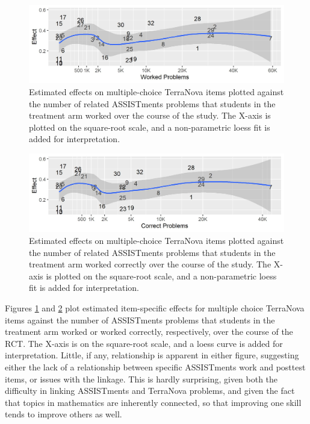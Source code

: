 \documentclass{edm_article}
\begin{document}
\begin{figure}
  \centering
  \includegraphics{../assEffectsWorkedProbs.jpg}
  \caption{Estimated effects on multiple-choice TerraNova items
    plotted against the number of related ASSISTments problems that
    students in the treatment arm worked over the course of the
    study. The X-axis is plotted on the square-root scale, and a
    non-parametric loess fit is added for interpretation.}
  \label{fig:workedProbs}
\end{figure}

\begin{figure}
  \centering
  \includegraphics{../assEffectsCorrectProbs.jpg}
  \caption{Estimated effects on multiple-choice TerraNova items
    plotted against the number of related ASSISTments problems that
    students in the treatment arm worked correctly over the course of the
    study. The X-axis is plotted on the square-root scale, and a
    non-parametric loess fit is added for interpretation.}
  \label{fig:correctProbs}
\end{figure}


Figures \ref{fig:workedProbs} and \ref{fig:correctProbs} plot
estimated item-specific effects for multiple choice TerraNova items against the number of ASSISTments
problems that students in the treatment arm worked or worked
correctly, respectively, over the course of the RCT.
The X-axis is on the square-root scale, and a loess curve is added for
interpretation. 
Little, if any, relationship is apparent in either figure, suggesting
either the lack of a relationship between specific ASSISTments work
and posttest items, or issues with the linkage.
This is hardly surprising, given both the difficulty in linking
ASSISTments and TerraNova problems, and given the fact that topics in
mathematics are inherently connected, so that improving one skill
tends to improve others as well.
\end{document}
